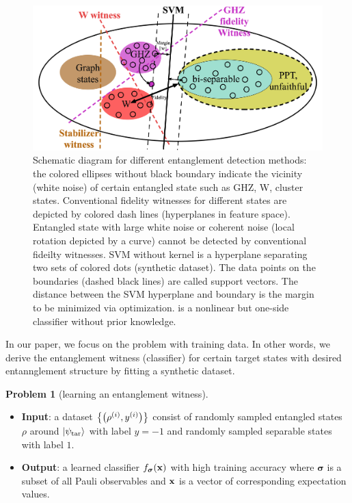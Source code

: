\documentclass[
aps,
pra,
twocolumn,
floatfix,
]{revtex4-2}
\theoremstyle{plain}
\theoremstyle{definition}
\newtheorem{problem}{Problem}
\newcommand{\dm}{\rho}
\newcommand{\target}{\textup{tar}}
\newcommand{\bmsigma}{\bm{\sigma}}
\begin{document}
\begin{figure}[!ht]
	\centering
		\centering
		\includegraphics[width=.6\linewidth]{schematic_entangle.png}
	\caption{Schematic diagram for different entanglement detection methods: the colored ellipses without black boundary indicate the vicinity (white noise) of certain entangled state such as GHZ, W, cluster states. Conventional fidelity witnesses for different states are depicted by colored dash lines (hyperplanes in feature space). Entangled state with large white noise or coherent noise (local rotation depicted by a curve) cannot be detected by conventional fideilty witnesses. SVM without kernel is a hyperplane separating two sets of colored dots (synthetic dataset). The data points on the boundaries (dashed black lines) are called support vectors. The distance between the SVM hyperplane and boundary is the margin to be minimized via optimization.  is a nonlinear but one-side classifier without prior knowledge.}
	\label{fig:entangle}
\end{figure}

In our paper, we focus on the  problem with training data.
In other words, we derive the entanglement witness (classifier) for certain target states with desired entannglement structure by fitting a synthetic dataset.
\begin{problem}[learning an entanglement witness]\label{prm:learn_witness}
	\;
	\begin{itemize}
		\item \textbf{Input}: a dataset $\qty{\qty(\dm^{(i)},y^{(i)})}$ consist of randomly sampled entangled states $\dm$ around $\ket{\psi_{\target}}$ with label $y=-1$ and randomly sampled separable states with label $1$.
		\item \textbf{Output}: a learned classifier $f_{\bmsigma}(\vbx)$ with high training accuracy where $\bmsigma$ is a subset of all Pauli observables and $\vb{x}$ is a vector of corresponding expectation values.
	\end{itemize}
\end{problem}
\end{document}
